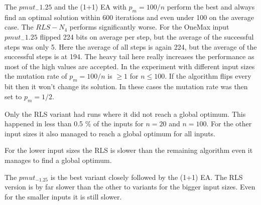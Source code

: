 

The $pmut_-1.25$ and the (1+1) EA with $p_m=100/n$ perform the best and always find an optimal solution within 600 iterations and even under 100 on the average case.
The $RLS-N_4$ performs significantly worse.
For the OneMax input $pmut_-1.25$ flipped 224 bits on average per step, but the average of the successful steps was only 5.
Here the average of all steps is again 224, but the average of the successful steps is at 194.
The heavy tail here really increases the performance as most of the high values are accepted.
In the experiment with different input sizes the mutation rate of $p_m=100/n$ is $\ge1$ for $n\le100$.
If the algorithm flips every bit then it won't change its solution.
In these cases the mutation rate was then set to $p_m=1/2$.



Only the RLS variant had runs where it did not reach a global optimum.
This happened in less than 0.5 \% of the inputs for $n=20$ and $n=100$.
For the other input sizes it also managed to reach a global optimum for all inputs.



For the lower input sizes the RLS is slower than the remaining algorithm even it manages to find a global optimum.



The $pmut_{-1.25}$ is the best variant closely followed by the (1+1) EA.
The RLS version is by far slower than the other to variants for the bigger input sizes.
Even for the smaller inputs it is still slower.
